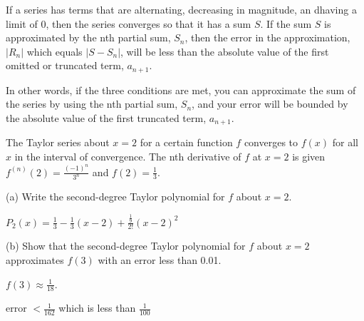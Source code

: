 \documentclass[../bccalc.tex]{subfiles}
\begin{document}
If a series has terms that are alternating, decreasing in magnitude, an dhaving a limit of 0, then the series converges so that it has a sum $S$. If the sum $S$ is approximated by the nth partial sum, $S_n$, then the error in the approximation, $|R_n|$ which equals $|S-S_n|$, will be less than the absolute value of the first omitted or truncated term, $a_{n+1}$.

In other words, if the three conditions are met, you can approximate the sum of the series by using the nth partial sum, $S_n$, and your error will be bounded by the absolute value of the first truncated term, $a_{n+1}$.

\begin{example}
    The Taylor series about $x=2$ for a certain function $f$ converges to $f(x)$ for all $x$ in the interval of convergence. The nth derivative of $f$ at $x=2$ is given $f^{(n)}(2)=\frac{(-1)^n}{3^n}$ and $f(2)=\frac{1}{3}$. 

    (a) Write the second-degree Taylor polynomial for $f$ about $x=2$.

    $P_2(x)=\frac{1}{3}-\frac{1}{3}(x-2)+\frac{\frac{1}{9}}{2!}(x-2)^2$

    (b) Show that the second-degree Taylor polynomial for $f$ about $x=2$ approximates $f(3)$ with an error less than 0.01.

    $f(3)\approx \frac{1}{18}$.

    error $<\frac{1}{162}$ which is less than $\frac{1}{100}$ 
\end{example}
\end{document}
